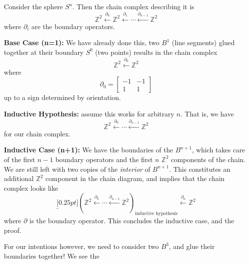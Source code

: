 \begin{thm}%
Consider the sphere $S^{n}$. Then the chain complex describing it
is
\begin{equation}%
\mathbb{Z}^{2} \xleftarrow{\partial_{0}}\mathbb{Z}^{2}\xleftarrow{\partial_{1}}\cdots\xleftarrow{\partial_{n-1}}\mathbb{Z}^{2}
\end{equation}
where $\partial_{i}$ are the boundary operators.
\end{thm}
\begin{sketch}
\noindent\textbf{Base Case (n=1):} We have already done this, two $B^{1}$
(line segments) glued together at their boundary $S^{0}$ (two
points) results in the chain complex
\begin{equation}%
\mathbb{Z}^{2}\xleftarrow{\partial_{0}}\mathbb{Z}^{2}
\end{equation}
where
\begin{equation}%
\partial_{0} = \begin{bmatrix}-1 & -1\\1 & 1\end{bmatrix}
\end{equation}
up to a sign determined by orientation.

\noindent\textbf{Inductive Hypothesis:} assume this works for arbitrary
$n$. That is, we have
\begin{equation}%
\mathbb{Z}^{2}\xleftarrow{\partial_{0}}\cdots\xleftarrow{\partial_{n-1}}\mathbb{Z}^{2}
\end{equation}
for our chain complex.

\noindent\textbf{Inductive Case (n+1):} We have the boundaries of the
$B^{n+1}$, which takes care of the first $n-1$ boundary operators
and the first $n$ $\mathbb{Z}^{2}$ components of the chain. We
are still left with two copies of the \emph{interior} of
$B^{n+1}$. This constitutes an additional $\mathbb{Z}^{2}$
component in the chain diagram, and implies that the chain
complex looks like
\begin{equation}%
\underbracket[0.25pt]{\left(\mathbb{Z}^{2}\xleftarrow{\partial_{0}}\cdots\xleftarrow{\partial_{n-1}}\mathbb{Z}^{2}\right)}_{\text{inductive hypothesis}}\xleftarrow{\partial_{n}}\mathbb{Z}^{2}
\end{equation}
where $\partial$ is the boundary operator. This concludes the
inductive case, and the proof. 
\end{sketch}
For our intentions however, we need to consider
two $B^{3}$, and glue their boundaries together! We see the
